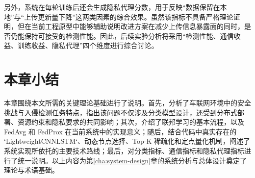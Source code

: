 另外，系统在每轮训练后还会生成隐私代理分数，用于反映“数据保留在本地”与“上传更新量下降”这两类因素的综合效果。虽然该指标不具备严格理论证明，但在当前工程原型中能够辅助说明改进方案在减少上传信息暴露面的同时，是否仍能保持可接受的检测性能。因此，后续实验分析将采用“检测性能、通信收益、训练收益、隐私代理”四个维度进行综合讨论。

\section{本章小结}
\label{sec:related-summary}

本章围绕本文所需的关键理论基础进行了说明。首先，分析了车联网环境中的安全挑战与入侵检测任务特点，指出该问题不仅涉及分类模型设计，还受到分布式部署、资源约束和隐私要求的共同影响；其次，介绍了联邦学习的基本流程，以及 FedAvg 和 FedProx 在当前系统中的实现意义；随后，结合代码中真实存在的 `LightweightCNNLSTM`、动态节点选择、Top-K 稀疏化和定点量化机制，阐述了系统实现所依托的主要技术路线；最后，对分类指标、通信指标和隐私代理指标进行了统一说明。以上内容为第\ref{cha:system-design}章的系统分析与总体设计奠定了理论与术语基础。
